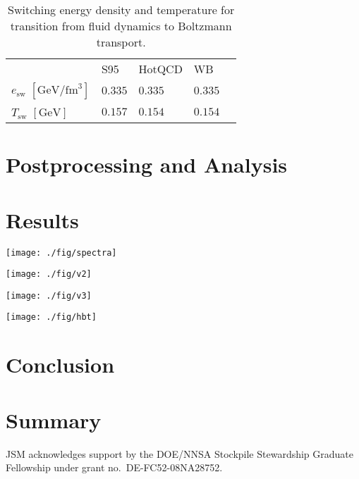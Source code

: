 \documentclass[aps,prc,reprint,amsmath,nofootinbib,superscriptaddress]{revtex4-1}
\begin{document}
\begin{table}
  \caption{
    \label{tab:tsw}
    Switching energy density and temperature for transition from fluid dynamics to Boltzmann transport.
  }
  \begin{ruledtabular}
  \begin{tabular}{lllll}
    & S95 & HotQCD & WB & \\
    \noalign{\smallskip}\hline\noalign{\smallskip}
    $e_\text{sw}$ $[\text{GeV}/\text{fm}^3]$ & $0.335$ & $0.335$ & $0.335$ &  \\
    $T_\text{sw}$ $[\text{GeV}]$ & $0.157$ & $0.154$ & $0.154$ & \\
  \end{tabular}
  \end{ruledtabular}
\end{table}


\section{Postprocessing and Analysis}

\section{Results}

\begin{figure*}[t]
  \texttt{[image: ./fig/spectra]}
  \caption{
    \label{fig:spectra}
  }
\end{figure*}

\begin{figure*}[t]
  \texttt{[image: ./fig/v2]}
  \caption{
    \label{fig:spectra}
  }
\end{figure*}

\begin{figure*}[t]
  \texttt{[image: ./fig/v3]}
  \caption{
    \label{fig:spectra}
  }
\end{figure*}

\begin{figure*}[t]
  \texttt{[image: ./fig/hbt]}
  \caption{
    \label{fig:spectra}
  }
\end{figure*}

\section{Conclusion}

\section{Summary}

\begin{acknowledgments}
 JSM acknowledges support by the DOE/NNSA Stockpile Stewardship Graduate Fellowship under grant no.~DE-FC52-08NA28752.
\end{acknowledgments}


\end{document}
